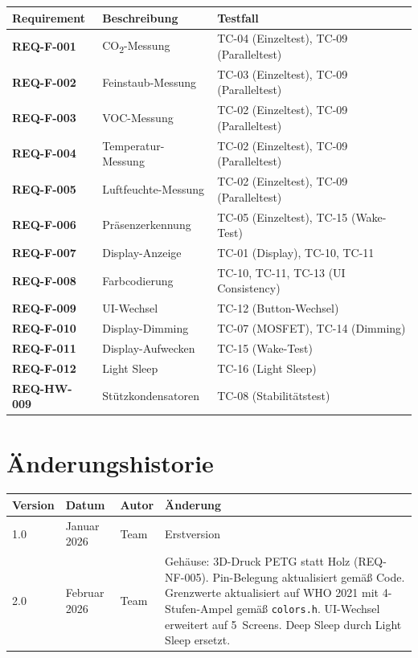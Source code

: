 \documentclass[a4paper,11pt]{article}
\begin{document}
\begin{longtable}{p{2.2cm} p{4cm} p{6cm}}
\toprule
\rowcolor{tableheader}
\textbf{Requirement} & \textbf{Beschreibung} & \textbf{Testfall} \\
\midrule
\endhead

\textbf{REQ-F-001} & CO\textsubscript{2}-Messung & TC-04 (Einzeltest), TC-09 (Paralleltest) \\
\textbf{REQ-F-002} & Feinstaub-Messung & TC-03 (Einzeltest), TC-09 (Paralleltest) \\
\textbf{REQ-F-003} & VOC-Messung & TC-02 (Einzeltest), TC-09 (Paralleltest) \\
\textbf{REQ-F-004} & Temperatur-Messung & TC-02 (Einzeltest), TC-09 (Paralleltest) \\
\textbf{REQ-F-005} & Luftfeuchte-Messung & TC-02 (Einzeltest), TC-09 (Paralleltest) \\
\textbf{REQ-F-006} & Präsenzerkennung & TC-05 (Einzeltest), TC-15 (Wake-Test) \\
\textbf{REQ-F-007} & Display-Anzeige & TC-01 (Display), TC-10, TC-11 \\
\textbf{REQ-F-008} & Farbcodierung & TC-10, TC-11, TC-13 (UI Consistency) \\
\textbf{REQ-F-009} & UI-Wechsel & TC-12 (Button-Wechsel) \\
\textbf{REQ-F-010} & Display-Dimming & TC-07 (MOSFET), TC-14 (Dimming) \\
\textbf{REQ-F-011} & Display-Aufwecken & TC-15 (Wake-Test) \\
\textbf{REQ-F-012} & Light Sleep & TC-16 (Light Sleep) \\
\textbf{REQ-HW-009} & Stützkondensatoren & TC-08 (Stabilitätstest) \\

\bottomrule
\end{longtable}

\section*{Änderungshistorie}

\begin{longtable}{l l l p{7cm}}
\toprule
\rowcolor{tableheader}
\textbf{Version} & \textbf{Datum} & \textbf{Autor} & \textbf{Änderung} \\
\midrule
1.0 & Januar 2026 & Team & Erstversion \\
2.0 & Februar 2026 & Team & Gehäuse: 3D-Druck PETG statt Holz (REQ-NF-005). Pin-Belegung aktualisiert gemäß Code. Grenzwerte aktualisiert auf WHO 2021 mit 4-Stufen-Ampel gemäß \texttt{colors.h}. UI-Wechsel erweitert auf 5~Screens. Deep Sleep durch Light Sleep ersetzt. \\
\bottomrule
\end{longtable}
\end{document}
